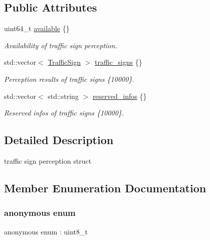 \subsection*{Public Attributes}
\begin{DoxyCompactItemize}
\item 
uint64\+\_\+t \hyperlink{structmaf__perception__interface_1_1TrafficSignPerception_a93a923b825027b1c5386480d7f36706a}{available} \{\}
\begin{DoxyCompactList}\small\item\em Availability of traffic sign perception. \end{DoxyCompactList}\item 
std\+::vector$<$ \hyperlink{structmaf__perception__interface_1_1TrafficSign}{Traffic\+Sign} $>$ \hyperlink{structmaf__perception__interface_1_1TrafficSignPerception_aaa1cf5b102db66d00a1e49d3d1fd28b7}{traffic\+\_\+signs} \{\}
\begin{DoxyCompactList}\small\item\em Perception results of traffic signs \{10000\}. \end{DoxyCompactList}\item 
std\+::vector$<$ std\+::string $>$ \hyperlink{structmaf__perception__interface_1_1TrafficSignPerception_a4a4e11fb4a4534d22b322b2433a1affa}{reserved\+\_\+infos} \{\}
\begin{DoxyCompactList}\small\item\em Reserved infos of traffic signs \{10000\}. \end{DoxyCompactList}\end{DoxyCompactItemize}


\subsection{Detailed Description}
traffic sign perception struct 

\subsection{Member Enumeration Documentation}
\mbox{\label{structmaf__perception__interface_1_1TrafficSignPerception_a4238a6b8a0f7547a267c7a3ac8438d42}} 
\subsubsection{\texorpdfstring{anonymous enum}{anonymous enum}}
{\footnotesize\ttfamily anonymous enum \+: uint8\+\_\+t}

